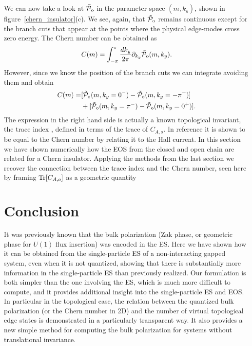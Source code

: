 \documentclass[twocolumn,amsmath,longbibliography,amssymb,superscriptaddress]{revtex4-1}
\newcommand{\tpo}{\tilde{\mathcal{P}}_{\rm o}}
\begin{document}
We can now take a look at $\tpo$ in the parameter space $(m,k_y)$, shown in figure~\ref{chern_insulator}(c). We see, again, that $\tpo$ remains continuous except for the branch cuts that appear at the points where the physical edge-modes cross zero energy. The Chern number can be obtained as
\begin{equation}
C(m) = \int_{-\pi}^{\pi}\frac{dk_y}{2\pi} \partial_{k_y} \tpo(m,k_y).
\label{eq:Zaletel_chern}
\end{equation}
However, since we know the position of the branch cuts we can integrate avoiding them and obtain
\begin{align}
C(m) =& [\tpo(m,k_y=0^-)-\tpo(m,k_y=-\pi^+)] \nonumber \\ 
&+[\tpo(m,k_y=\pi^-)-\tpo(m,k_y=0^+)]. 
\end{align}
The expression in the right hand side is actually a known topological invariant, the trace index \cite{Alexandrinata2011}, defined in terms of the trace of $C_{A,o}$. In reference \cite{Alexandrinata2011} it is shown to be equal to the Chern number by relating it to the Hall current. In this section we have shown numerically how the EOS from the closed and open chain are related for a Chern insulator. Applying the methods from the last section we recover the connection between the trace index and the Chern number, seen here by framing $\Tr[C_{A,o}]$ as a geometric quantity 





\section{Conclusion}

It was previously known that the bulk polarization (Zak phase, or geometric phase for $U(1)$ flux insertion) was encoded in the ES. Here we have shown how it can be obtained from the single-particle ES of a non-interacting gapped system, even when it is not quantized, showing that there is substantially more information in the single-particle ES than previously realized. 
Our formulation is both simpler than the one involving the ES, which is much more difficult to compute, and it provides additional insight into the single-particle ES and EOS. In particular in the topological case, the relation between the quantized bulk polarization (or the Chern number in 2D) and the number of virtual topological edge states is demonstrated in a particularly transparent way. It also provides a new simple method for computing the bulk polarization for systems without translational invariance. 
\end{document}
